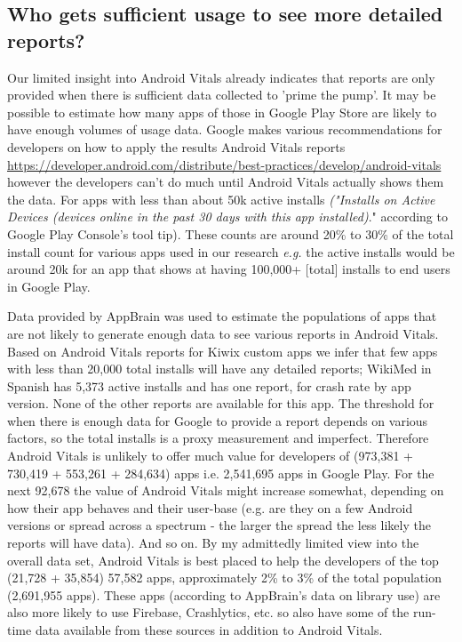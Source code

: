 \subsection{Who gets sufficient usage to see more detailed reports?}
Our limited insight into Android Vitals already indicates that reports are only provided when there is sufficient data collected to 'prime the pump'. It may be possible to estimate how many apps of those in Google Play Store are likely to have enough volumes of usage data. Google makes various recommendations for developers on how to apply the results Android Vitals reports \url{https://developer.android.com/distribute/best-practices/develop/android-vitals} however the developers can't do much until Android Vitals actually shows them the data. For apps with less than about 50k active installs \textit{("Installs on Active Devices (devices online in the past 30 days with this app installed)}." according to Google Play Console's tool tip). These counts are around 20\% to 30\% of the total install count for various apps used in our research \textit{e.g.} the active installs would be around 20k for an app that shows at having 100,000+ [total] installs to end users in Google Play.

Data provided by AppBrain\cite{appbrain_download_statistics_june_2019} was used to estimate the populations of apps that are not likely to generate enough data to see various reports in Android Vitals.
% 
Based on Android Vitals reports for Kiwix custom apps we infer that few apps with less than 20,000 total installs will have any detailed reports; WikiMed in Spanish has 5,373 active installs and has one report, for crash rate by app version. None of the other reports are available for this app. The threshold for when there is enough data for Google to provide a report depends on various factors, so the total installs is a proxy measurement and imperfect. Therefore Android Vitals is unlikely to offer much value for developers of (973,381 + 730,419 + 553,261 + 284,634) apps i.e. 2,541,695 apps in Google Play. For the next 92,678 the value of Android Vitals might increase somewhat, depending on how their app behaves and their user-base (e.g. are they on a few Android versions or spread across a spectrum - the larger the spread the less likely the reports will have data). And so on. By my admittedly limited view into the overall data set, Android Vitals is best placed to help the developers of the top (21,728 + 35,854) 57,582 apps, approximately 2\% to 3\% of the total population (2,691,955 apps). These apps (according to AppBrain's data on library use) are also more likely to use Firebase, Crashlytics, etc. so also have some of the run-time data available from these sources in addition to Android Vitals.

